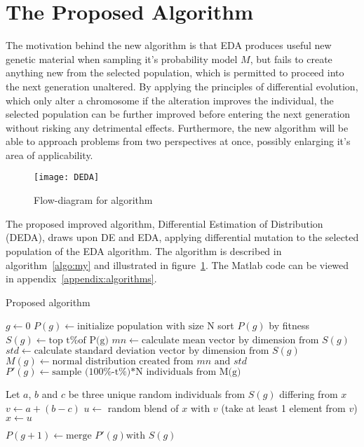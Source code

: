 \section{The Proposed Algorithm}

The motivation behind the new algorithm is that EDA produces useful new genetic material when sampling it's probability model $M$, but fails to create anything new from the selected population, which is permitted to proceed into the next generation unaltered. By applying the principles of differential evolution, which only alter a chromosome if the alteration improves the individual, the selected population can be further improved before entering the next generation without risking any detrimental effects. Furthermore, the new algorithm will be able to approach problems from two perspectives at once, possibly enlarging it's area of applicability.

\begin{figure}[H]
  \centering
  \texttt{[image: DEDA]}
  \caption{Flow-diagram for algorithm}
  \label{fig:flowalg}
\end{figure}

The proposed improved algorithm, Differential Estimation of Distribution (DEDA), draws upon DE and EDA, applying differential mutation to the selected population of the EDA algorithm. The algorithm is described in algorithm~\ref{algo:my} and illustrated in figure~\ref{fig:flowalg}. The Matlab code can be viewed in appendix~\ref{appendix:algorithms}.


\begin{algorithm}[h]
  \caption{Proposed algorithm}
  \label{algo:my}
    \begin{algorithmic}
      \State $g\gets 0$
      \State $P(g)\gets \text{initialize population with size N}$
      \Repeat
        \State sort $P(g)$ by fitness
        \State $S(g)\gets \text{top t\% of P(g)}$
        \State $mn\gets \text{calculate mean vector by dimension from } S(g)$
        \State $std\gets \text{calculate standard deviation vector by dimension from } S(g)$
        \State $M(g)\gets \text{normal distribution created from } mn \text{ and } std$
        \State $P'(g)\gets \text{sample (100\%-t\%)*N individuals from M(g)}$

          \State Let $a$, $b$ and $c$ be three unique random individuals from $S(g)$ differing from $x$
          \State $v\gets a+(b-c)$
          \State $u\gets$ random blend of $x$ with $v$ (take at least 1 element from $v$)
            \State $x\gets u$
          \EndIf
        \EndFor

        \State $P(g+1)\gets \text{merge } P'(g) \text{with } S(g)$
    \end{algorithmic}
\end{algorithm}

